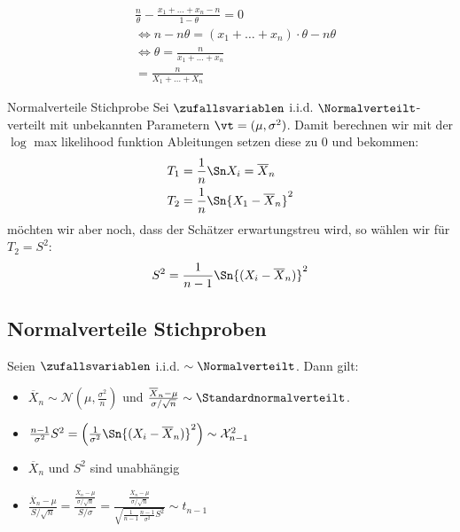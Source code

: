 \begin{align*}
   & \frac{n}{\theta} - \frac{x_1 + \ldots + x_n - n}{1 - \theta} = 0               \\
   & \Longleftrightarrow n - n\theta =  (x_1 + \ldots + x_n) \cdot \theta - n\theta \\
   & \Longleftrightarrow \theta = \frac{n}{x_1 + \ldots + x_n}                      \\
   & = \frac{n}{X_1 + \ldots + X_n}
\end{align*}

\BoxEnd{}

\begin{definition}{Normalverteile Stichprobe}
  Sei $\zufallsvariablen$ i.i.d. $\Normalverteilt$-verteilt mit unbekannten
  Parametern $\vt = (\mu, \sigma^2)$. Damit berechnen wir mit der $\log$ max
  likelihood funktion Ableitungen setzen diese zu $0$ und bekommen:
  \begin{align*}
    T_1 & = \frac{1}{n} \Sn X_i = \overline{X}_n     \\
    T_2 & = \frac{1}{n} \Sn {X_1 - \overline{X}_n}^2
  \end{align*}
  möchten wir aber noch, dass der Schätzer erwartungstreu wird,
  so wählen wir für $T_2 = S^2$:
  \begin{align*}
    S^2 = \frac{1}{n-1} \Sn  {(X_i - \overline{X}_n)}^2
  \end{align*}
\end{definition}
\subsection{Normalverteile Stichproben}
Seien $\zufallsvariablen$ i.i.d. $\sim \Normalverteilt$. Dann gilt:
\begin{itemize}
  \item $\overline{X}_n \sim \mathcal{N} (\mu, \frac{\sigma^2}{n})$
        und $\frac{\overline{X}_n - \mu}{\sigma / \sqrt{n}} \sim \Standardnormalverteilt$.
  \item $\frac{n-1}{\sigma^2} S^2 = \left( \frac{1}{\sigma^2} \Sn  {(X_i - \overline{X}_n)}^2 \right) \sim \mathcal{X}^2_{n-1}$
  \item $\overline{X}_n$ und $S^2$ sind unabhängig
  \item $\frac{\overline{X}_n - \mu}{S / \sqrt{n}} = \frac{ \frac{\overline{X}_n - \mu}{\sigma / \sqrt{n}} }{S / \sigma} = \frac{ \frac{\overline{X}_n - \mu}{\sigma / \sqrt{n}} }{\sqrt{\frac{1}{n-1} \frac{n-1}{\sigma^2} S^2}} \sim t_{n-1}$
\end{itemize}

